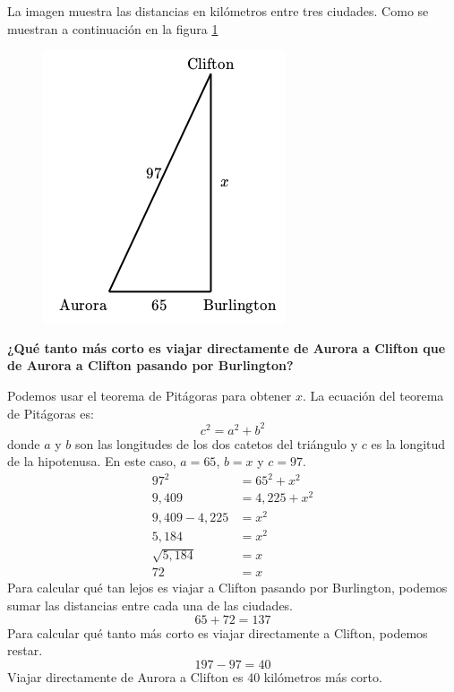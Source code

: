 La imagen muestra las distancias en kilómetros entre tres ciudades.
Como se muestran a continuación en la figura \ref{fig:proverb_pitagoras_04}
\begin{figure}[H]
    \begin{center}
        \includegraphics[width=0.25\linewidth]{../images/proverb_pitagoras_04.png}
    \end{center}
    \caption{}
    \label{fig:proverb_pitagoras_04}
\end{figure}
\textbf{¿Qué tanto más corto es viajar directamente de Aurora a Clifton que de Aurora a Clifton pasando por Burlington?}\\

\begin{solutionbox}{12cm}
    Podemos usar el teorema de Pitágoras para obtener $x$.
    La ecuación del teorema de Pitágoras es:
    \[c^2=a^2+b^2\]
    donde $a$ y $b$ son las longitudes de los dos catetos del triángulo y $c$ es la longitud de la hipotenusa.
    En este caso, $a=65$, $b=x$ y $c=97$.
    \begin{align*}
        97^2         & =65^2+x^2     \\
        9,409        & = 4,225 + x^2 \\
        9,409-4,225  & =x^2          \\
        5,184        & =x^2          \\
        \sqrt{5,184} & =x            \\
        72           & = x
    \end{align*}
    Para calcular qué tan lejos es viajar a Clifton pasando por Burlington, podemos sumar las distancias entre cada una de las ciudades.
    \[65+72=137\]
    Para calcular qué tanto más corto es viajar directamente a Clifton, podemos restar.
    \[197-97=40\]
    Viajar directamente de Aurora a Clifton es 40 kilómetros más corto.
\end{solutionbox}
